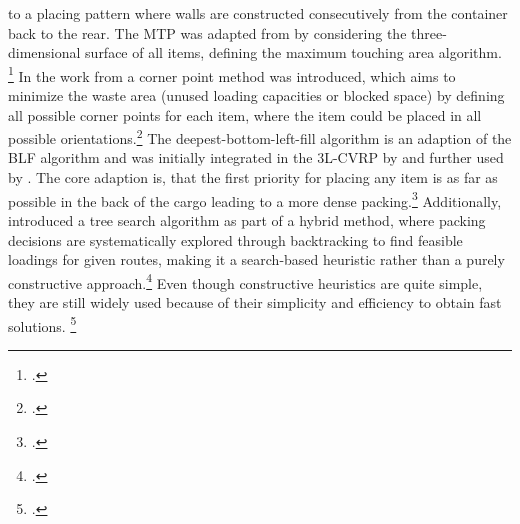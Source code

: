 to a placing pattern where walls are constructed consecutively from the container back to the rear. The
\gls{MTP} was adapted from \cite{tarantilis_hybrid_2009} by considering the three-dimensional
surface of all items, defining the maximum touching area algorithm. \footcite[cf.][pp. 258--260]{tarantilis_hybrid_2009}
In the work from \cite{tao_effective_2015} a corner point method
was introduced, which aims to minimize the waste area (unused loading capacities or blocked space) by
defining all possible corner points for each item, where the item could be placed in all possible
orientations.\footcite[cf.][pp. 130--132]{tao_effective_2015} The deepest-bottom-left-fill algorithm
is an adaption of the \gls{BLF} algorithm and was initially integrated in the \gls{3L-CVRP} by \cite{wang_two_2010}
and further used by \cite{krebs_advanced_2021}.
The core adaption is, that the first priority for placing any item is as far as possible in the back of the cargo
leading to a more dense packing.\footcites(cf.)()[pp. 259--263]{wang_two_2010}[p. 8f]{krebs_axle_2021}
Additionally, \cite{bortfeldt_hybrid_2012} introduced a tree search algorithm as part of a hybrid method,
where packing decisions are systematically explored through backtracking to find feasible loadings for
given routes, making it a search-based heuristic rather than a purely constructive approach.\footcite[cf.][p. 2251f]{bortfeldt_hybrid_2012}
Even though constructive heuristics are quite simple, they are still widely used because of their simplicity and efficiency to obtain fast solutions.
\footcite[cf.][pp. 11--13]{tamke_branch-and-cut_2024}

